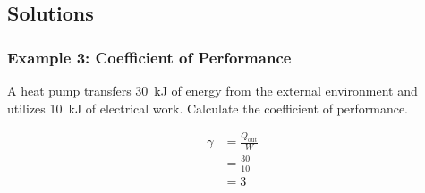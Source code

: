 \documentclass{article}
\begin{document}
\subsection*{Solutions}

\subsubsection*{Example 3: Coefficient of Performance}

A heat pump transfers \SI{30}{kJ} of energy from the external environment and utilizes \SI{10}{kJ} of electrical work. Calculate the coefficient of performance.

\begin{align*}
    \gamma &= \frac{Q_{\text{out}}}{W} \\
    &= \frac{30}{10} \\
    &= \SI{3}{}
\end{align*}
\end{document}
